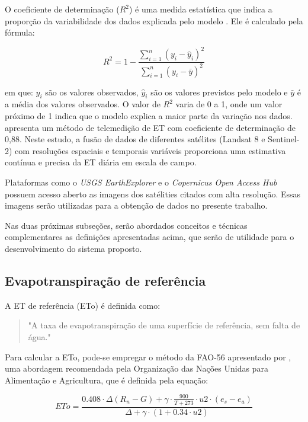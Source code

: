 O coeficiente de determinação (\(R^2\)) é uma medida estatística que indica a proporção da variabilidade dos dados explicada pelo modelo \parencite{mood1974}. Ele é calculado pela fórmula:

\[
R^2 = 1 - \frac{\sum_{i=1}^n (y_i - \hat{y}_i)^2}{\sum_{i=1}^n (y_i - \bar{y})^2}
\]

\noindent em que: \(y_i\) são os valores observados, \(\hat{y}_i\) são os valores previstos pelo modelo e \(\bar{y}\) é a média dos valores observados. O valor de \(R^2\) varia de 0 a 1, onde um valor próximo de 1 indica que o modelo explica a maior parte da variação nos dados. \textcite{Yang_evapotranspiration_med2022} apresenta um método de telemedição de ET com coeficiente de determinação de 0,88. Neste estudo, a fusão de dados de diferentes satélites (Landsat 8 e Sentinel-2) com resoluções espaciais e temporais variáveis proporciona uma estimativa contínua e precisa da ET diária em escala de campo.


Plataformas como o \textit{USGS EarthExplorer} e o \textit{Copernicus Open Access Hub} possuem acesso aberto as imagens dos satélities citados com alta resolução. Essas imagens serão utilizadas para a obtenção de dados no presente trabalho.

Nas duas próximas subseções, serão abordados conceitos e técnicas complementares as definições apresentadas acima, que serão de utilidade para o desenvolvimento do sistema proposto.

\subsection{Evapotranspiração de referência}

A ET de referência (ETo) é definida como:

\begin{quote}
  "A taxa de evapotranspiração de uma superfície de referência, sem falta de água." \parencite[{p. 7}]{Allen_evapotranspiration1998}
\end{quote}

Para calcular a ETo, pode-se empregar o método da FAO-56 apresentado por \textcite{Allen_evapotranspiration1998}, uma abordagem recomendada pela Organização das Nações Unidas para Alimentação e Agricultura, que é definida pela equação:

\begin{equation}
ETo = \frac{0.408 \cdot \Delta (R_n - G) + \gamma \cdot \frac{900}{T + 273} \cdot u2 \cdot (e_s - e_a)}{\Delta + \gamma \cdot (1 + 0.34 \cdot u2)}
\end{equation}

